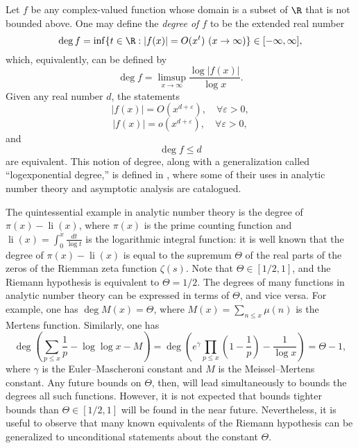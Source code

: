 \begin{remark}  
Let $f$ be any complex-valued function whose domain is a subset of $\R$ that is not bounded above.   One may define the \emph{degree of $f$} to be the extended real number
$$\deg f = \inf\{t \in \R: |f(x)| = O(x^t) \ (x \to \infty)\} \in [-\infty,\infty],$$ 
which, equivalently, can be defined by
$$\deg f = \limsup_{x \to \infty} \frac{\log |f(x)|}{\log x}.$$
Given any real number $d$, the statements
 $$|f(x)| = O(x^{d + \varepsilon}), \quad \forall \varepsilon > 0,$$ 
$$|f(x)| = o(x^{d + \varepsilon}), \quad \forall \varepsilon > 0,$$ 
and  $$\deg f \leq d$$
are equivalent.   This notion of degree,  along with a generalization called ``logexponential degree,'' is defined in \cite{ell},  where some of their  uses in analytic number theory and asymptotic analysis are catalogued.  

The quintessential example in analytic number theory is  the degree of $\pi(x)-\operatorname{li}(x)$, where $\pi(x)$ is the prime counting function and $\operatorname{li}(x) = \int_0^x \frac{dt}{\log t}$ is the logarithmic integral function: it is well known that the degree of $\pi(x)-\operatorname{li}(x)$ is equal to the supremum $\Theta$ of the real parts of the zeros of the Riemman zeta function $\zeta(s)$.   Note that $\Theta \in [1/2, 1]$, and the Riemann hypothesis is equivalent to $\Theta = 1/2$.    The degrees of many functions in analytic number theory can be expressed in terms of $\Theta$, and vice versa.   For example, one has $\deg M(x) = \Theta$, where $M(x) = \sum_{n \leq x} \mu(n)$ is the Mertens function.   Similarly, one has $$\deg \left(\sum_{p \leq x} \frac{1}{p}  -  \log \log x-M\right) =  \deg \left(e^{\gamma} \prod_{p \leq x}\left(1-\frac{1}{p}\right) - \frac{1 }{\log x}\right) =  \Theta-1,$$ where $\gamma$ is the Euler--Mascheroni constant and $M$ is the Meissel--Mertens constant.  Any future bounds on $\Theta$, then, will lead simultaneously to bounds the degrees all such functions. However, it is not expected that bounds tighter bounds than  $\Theta \in [1/2, 1]$ will be found in the near future. Nevertheless, it is useful to observe that many known equivalents of the Riemann hypothesis can be generalized to unconditional statements about the constant $\Theta$.  


\end{remark}
